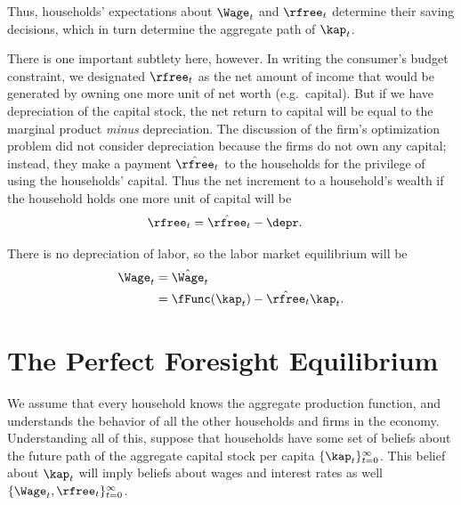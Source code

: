 \documentclass{handout}
\begin{document}
Thus, households' expectations about $\Wage_{t}$ and
$\rfree_{t}$ determine their saving decisions, which in turn determine the
aggregate path of $\kap_{t}$.

There is one important subtlety here, however.  In writing the 
consumer's budget constraint, we designated $\rfree_{t}$ as the net amount 
of income that would be generated by owning one more unit of net worth 
(e.g.\  capital).  But if we have depreciation of the capital stock, 
the net return to capital will be equal to the marginal product {\it minus}
depreciation.  The discussion of the firm's optimization problem did 
not consider depreciation because the firms do not own any capital; 
instead, they make a payment $\hat{\rfree}_{t}$ to the households for the 
privilege of using the households' capital.  Thus the net increment to 
a household's wealth if the household holds one more unit of capital 
will be
\begin{equation*}\begin{gathered}\begin{aligned}
        \rfree_{t} & =  \hat{\rfree}_{t}-\depr.
\end{aligned}\end{gathered}\end{equation*}

There is no depreciation of labor, so the labor market equilibrium
will be
\begin{equation*}\begin{gathered}\begin{aligned}
        \Wage_{t} & =  \hat{\Wage}_{t}
\\        & =  \fFunc(\kap_{t})- \hat{\rfree}_{t}\kap_{t}      
.
\end{aligned}\end{gathered}\end{equation*}

\section{The Perfect Foresight Equilibrium}

We assume that every household knows the aggregate production 
function, and understands the behavior of all the other households and 
firms in the economy.  Understanding all of this, suppose that 
households have some set of beliefs about the future path of the 
aggregate capital stock per capita $\{\kap_{t}\}_{t=0}^{\infty}$.  This 
belief about $\kap_{t}$ will imply beliefs about wages and interest rates 
as well $\{\Wage_{t},\rfree_{t}\}_{t=0}^{\infty}$.
\end{document}
